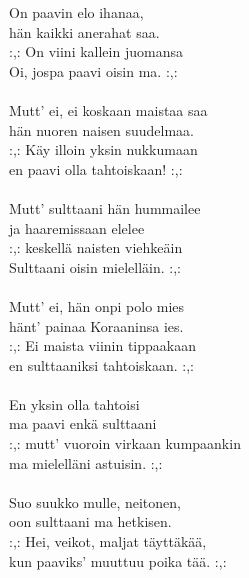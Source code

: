 
            On paavin elo ihanaa, \\
            hän kaikki anerahat saa. \\
            :,: On viini kallein juomansa \\
            Oi, jospa paavi oisin ma. :,: \\
\hspace{10mm} \\
            Mutt’ ei, ei koskaan maistaa saa \\
            hän nuoren naisen suudelmaa. \\
            :,: Käy illoin yksin nukkumaan \\
            en paavi olla tahtoiskaan! :,: \\
\hspace{10mm} \\
            Mutt’ sulttaani hän hummailee \\
            ja haaremissaan elelee \\
            :,: keskellä naisten viehkeäin \\
            Sulttaani oisin mielelläin. :,: \\
\hspace{10mm} \\
            Mutt’ ei, hän onpi polo mies \\
            hänt’ painaa Koraaninsa ies. \\
            :,: Ei maista viinin tippaakaan \\
            en sulttaaniksi tahtoiskaan. :,: \\
\hspace{10mm} \\
            En yksin olla tahtoisi \\
            ma paavi enkä sulttaani \\
            :,: mutt’ vuoroin virkaan kumpaankin \\
            ma mielelläni astuisin. :,: \\
\hspace{10mm} \\
            Suo suukko mulle, neitonen, \\
            oon sulttaani ma hetkisen. \\
            :,: Hei, veikot, maljat täyttäkää, \\
            kun paaviks’ muuttuu poika tää. :,: \\
